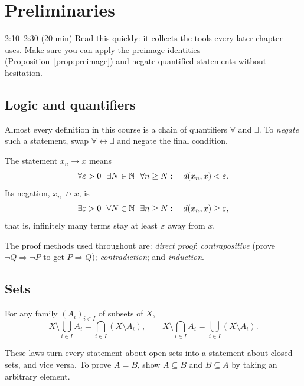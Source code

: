 \chapter{Preliminaries}\label{ch:0}
\begin{studyslot}{2:10--2:30 (20 min)}
Read this quickly: it collects the tools every later chapter uses. Make sure you can apply the preimage identities (Proposition~\ref{prop:preimage}) and negate quantified statements without hesitation.
\end{studyslot}

\section{Logic and quantifiers}
Almost every definition in this course is a chain of quantifiers $\forall$ and $\exists$. To \emph{negate} such a statement, swap $\forall\leftrightarrow\exists$ and negate the final condition.

\begin{example}
The statement $x_n\to x$ means
\[
  \forall \eps>0\ \ \exists N\in\N\ \ \forall n\ge N:\quad d(x_n,x)<\eps .
\]
Its negation, $x_n\not\to x$, is
\[
  \exists \eps>0\ \ \forall N\in\N\ \ \exists n\ge N:\quad d(x_n,x)\ge\eps ,
\]
that is, infinitely many terms stay at least $\varepsilon$ away from $x$.
\end{example}

The proof methods used throughout are: \emph{direct proof}; \emph{contrapositive} (prove $\neg Q\Rightarrow\neg P$ to get $P\Rightarrow Q$); \emph{contradiction}; and \emph{induction}.

\section{Sets}
\begin{proposition}
For any family $(A_i)_{i\in I}$ of subsets of $X$,
\[
  X\setminus \bigcup_{i\in I} A_i = \bigcap_{i\in I}(X\setminus A_i),
  \qquad
  X\setminus \bigcap_{i\in I} A_i = \bigcup_{i\in I}(X\setminus A_i).
\]
\end{proposition}
These laws turn every statement about open sets into a statement about closed sets, and vice versa. To prove $A=B$, show $A\subseteq B$ and $B\subseteq A$ by taking an arbitrary element.

